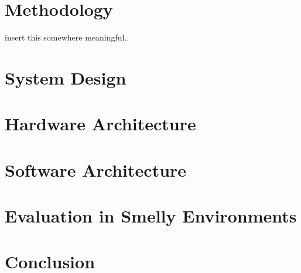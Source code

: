 \documentclass{sigchi}
\begin{document}
\section{Methodology}
insert this somewhere meaningful..

\section{System Design}


\section{Hardware Architecture}


\section{Software Architecture}


\section{Evaluation in Smelly Environments}


\section{Conclusion}




\end{document}
